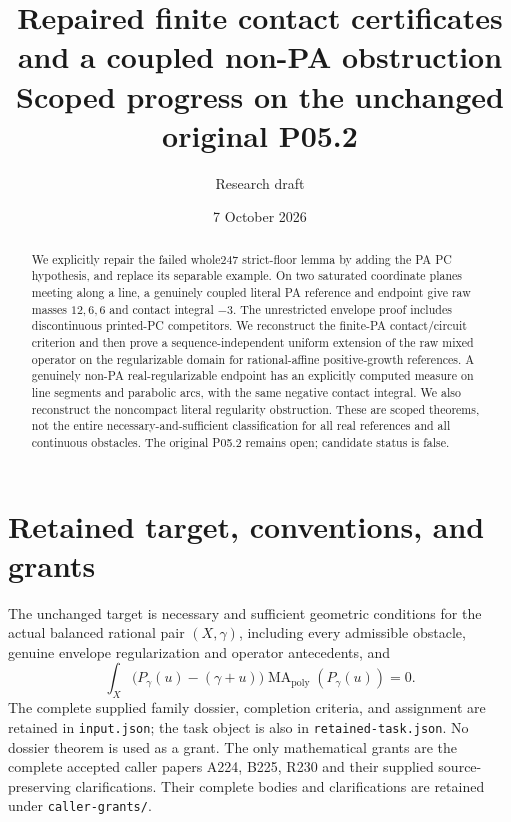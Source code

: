 \documentclass[11pt]{article}
\title{Repaired finite contact certificates and a coupled non-PA obstruction\\
\large Scoped progress on the unchanged original P05.2}
\author{Research draft}
\date{7 October 2026}
\newcommand{\MA}{\operatorname{MA}_{\mathrm{poly}}}
\begin{document}
\maketitle
\begin{abstract}
We explicitly repair the failed whole247 strict-floor lemma by adding the
PA PC hypothesis, and replace its separable example. On two saturated
coordinate planes meeting along a line, a genuinely coupled literal PA
reference and endpoint give raw masses $12,6,6$ and contact integral $-3$.
The unrestricted envelope proof includes discontinuous printed-PC
competitors. We reconstruct the finite-PA contact/circuit criterion and
then prove a sequence-independent uniform extension of the raw mixed
operator on the regularizable domain for rational-affine positive-growth
references. A genuinely non-PA real-regularizable endpoint has an explicitly
computed measure on line segments and parabolic arcs, with the same negative
contact integral. We also reconstruct the noncompact literal regularity
obstruction. These are scoped theorems, not the entire necessary-and-sufficient
classification for all real references and all continuous obstacles.
The original P05.2 remains open; candidate status is false.
\end{abstract}

\section{Retained target, conventions, and grants}
The unchanged target is necessary and sufficient geometric conditions for
the actual balanced rational pair \((X,\gamma)\), including every admissible
obstacle, genuine envelope regularization and operator antecedents, and
\[
 \int_X\bigl(P_\gamma(u)-(\gamma+u)\bigr)\MA(P_\gamma(u))=0.
\]
The complete supplied family dossier, completion criteria, and assignment
are retained in \texttt{input.json}; the task object is also in \texttt{retained-task.json}. No
dossier theorem is used as a grant. The only mathematical grants are the
complete accepted caller papers A224, B225, R230 and their supplied
source-preserving clarifications. Their complete bodies and clarifications
are retained under \texttt{caller-grants/}.
\end{document}
